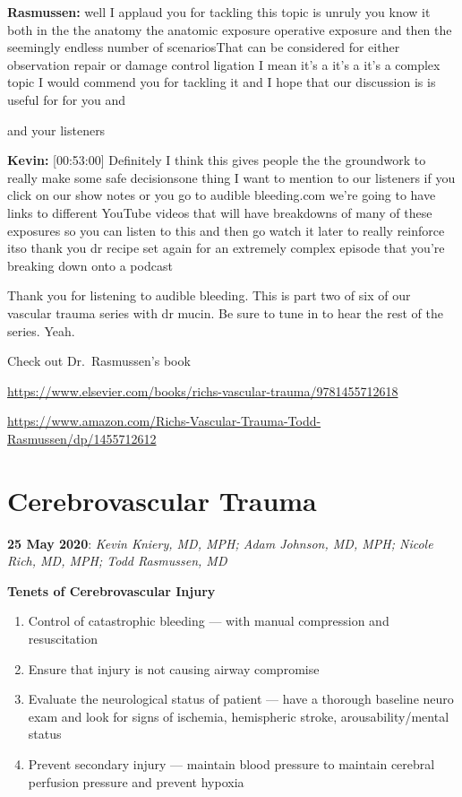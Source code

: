 \documentclass[
]{book}
\providecommand{\tightlist}{%
  \setlength{\itemsep}{0pt}\setlength{\parskip}{0pt}}
\begin{document}
\textbf{Rasmussen:} well I applaud you for tackling this topic is unruly you
know it both in the the anatomy the anatomic exposure operative exposure
and then the seemingly endless number of scenariosThat can be considered
for either observation repair or damage control ligation I mean it's a
it's a it's a complex topic I would commend you for tackling it and I
hope that our discussion is is useful for for you and

and your listeners

\textbf{Kevin:} {[}00:53:00{]} Definitely I think this gives people the the
groundwork to really make some safe decisionsone thing I want to mention
to our listeners if you click on our show notes or you go to audible
bleeding.com we're going to have links to different YouTube videos that
will have breakdowns of many of these exposures so you can listen to
this and then go watch it later to really reinforce itso thank you dr
recipe set again for an extremely complex episode that you're breaking
down onto a podcast

Thank you for listening to audible bleeding. This is part two of six of
our vascular trauma series with dr mucin. Be sure to tune in to hear the
rest of the series. Yeah.

Check out Dr.~Rasmussen's book

\url{https://www.elsevier.com/books/richs-vascular-trauma/9781455712618}

\url{https://www.amazon.com/Richs-Vascular-Trauma-Todd-Rasmussen/dp/1455712612}

\hypertarget{cerebrovascular-trauma}{%
\section{Cerebrovascular Trauma}\label{cerebrovascular-trauma}}

\textbf{25 May 2020}: \emph{Kevin Kniery, MD, MPH; Adam Johnson, MD, MPH; Nicole
Rich, MD, MPH; Todd Rasmussen, MD}

\textbf{Tenets of Cerebrovascular Injury}

\begin{enumerate}
\def\labelenumi{\arabic{enumi}.}
\tightlist
\item
  Control of catastrophic bleeding --- with manual compression and resuscitation
\item
  Ensure that injury is not causing airway compromise
\item
  Evaluate the neurological status of patient --- have a thorough baseline neuro exam and look for signs of ischemia, hemispheric stroke, arousability/mental status
\item
  Prevent secondary injury --- maintain blood pressure to maintain cerebral perfusion pressure and prevent hypoxia
\end{enumerate}
\end{document}

